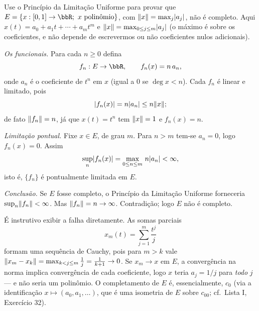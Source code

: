 \begin{exercicio}{Use o Princípio da Limitação Uniforme para provar que $E=\{x:[0,1]\to\R;\ x \text{ polinômio}\}$, com $\lVert x\rVert=\max_{j}\lvert a_j\rvert$, não é completo.}
\sol
Aqui $x(t)=a_0+a_1t+\cdots+a_mt^m$ e $\lVert x\rVert=\max_{0\le j\le m}\lvert a_j\rvert$ (o máximo é sobre os coeficientes, e não depende de escrevermos ou não coeficientes nulos adicionais).

\emph{Os funcionais.} Para cada $n\ge0$ defina
\[ f_n:E\to\R,\qquad f_n(x)=n\,a_n, \]
onde $a_n$ é o coeficiente de $t^n$ em $x$ (igual a $0$ se $\deg x<n$). Cada $f_n$ é linear e limitado, pois
\[ \lvert f_n(x)\rvert=n\lvert a_n\rvert\le n\lVert x\rVert; \]
de fato $\lVert f_n\rVert=n$, já que $x(t)=t^n$ tem $\lVert x\rVert=1$ e $f_n(x)=n$.

\emph{Limitação pontual.} Fixe $x\in E$, de grau $m$. Para $n>m$ tem-se $a_n=0$, logo $f_n(x)=0$. Assim
\[ \sup_n\lvert f_n(x)\rvert=\max_{0\le n\le m}\,n\lvert a_n\rvert<\infty, \]
isto é, $\{f_n\}$ é pontualmente limitada em $E$.

\emph{Conclusão.} Se $E$ fosse completo, o Princípio da Limitação Uniforme forneceria $\sup_n\lVert f_n\rVert<\infty$. Mas $\lVert f_n\rVert=n\to\infty$. Contradição; logo $E$ não é completo.

\begin{obs}
É instrutivo exibir a falha diretamente. As somas parciais
\[ x_m(t)=\sum_{j=1}^{m}\frac{t^j}{j} \]
formam uma sequência de Cauchy, pois para $m>k$ vale $\lVert x_m-x_k\rVert=\max_{k<j\le m}\frac1j=\frac{1}{k+1}\to0$. Se $x_m\to x$ em $E$, a convergência na norma implica convergência de cada coeficiente, logo $x$ teria $a_j=1/j$ para \emph{todo} $j$ --- e não seria um polinômio. O completamento de $E$ é, essencialmente, $c_0$ (via a identificação $x\mapsto(a_0,a_1,\dots)$, que é uma isometria de $E$ sobre $c_{00}$; cf.\ Lista I, Exercício 32).
\end{obs}
\end{exercicio}
